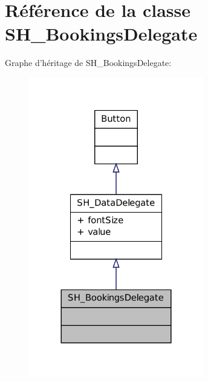 \hypertarget{classSH__BookingsDelegate}{\section{Référence de la classe S\-H\-\_\-\-Bookings\-Delegate}
\label{classSH__BookingsDelegate}
}


Graphe d'héritage de S\-H\-\_\-\-Bookings\-Delegate\-:
\nopagebreak
\begin{figure}[H]
\begin{center}
\leavevmode
\includegraphics[width=216pt]{classSH__BookingsDelegate__inherit__graph}
\end{center}
\end{figure}


